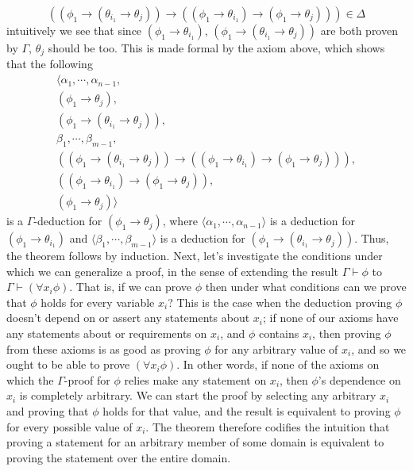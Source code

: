 \documentclass{article}
\begin{document}
{    $$ ((\phi_1 \rightarrow (\theta_{i_1} \rightarrow \theta_j)) \rightarrow ((\phi_1 \rightarrow \theta_{i_1}) \rightarrow (\phi_1 \rightarrow \theta_j))) \in \Delta $$
intuitively we see that since $ (\phi_1 \rightarrow \theta_{i_1}) $, $ (\phi_1 \rightarrow (\theta_{i_1} \rightarrow \theta_j)) $ are both proven by $ \Gamma $, $ \theta_j $ should be too. This is made formal by the axiom above, which shows that the following
$$ \begin{gathered}
    \langle \alpha_1, \cdots, \alpha_{n - 1}, \\
    (\phi_1 \rightarrow \theta_j), \\
    (\phi_1 \rightarrow (\theta_{i_1} \rightarrow \theta_j)), \\
    \beta_1, \cdots, \beta_{m - 1}, \\
    ((\phi_1 \rightarrow (\theta_{i_1} \rightarrow \theta_j)) \rightarrow ((\phi_1 \rightarrow \theta_{i_1}) \rightarrow (\phi_1 \rightarrow \theta_j))), \\
    ((\phi_1 \rightarrow \theta_{i_1}) \rightarrow (\phi_1 \rightarrow \theta_j)), \\
    (\phi_1 \rightarrow \theta_j) \rangle \nonumber
\end{gathered} $$
is a $ \Gamma $-deduction for $ (\phi_1 \rightarrow \theta_j) $, where $ \langle \alpha_1, \cdots, \alpha_{n - 1} \rangle $ is a deduction for $ (\phi_1 \rightarrow \theta_{i_1}) $ and $ \langle \beta_1, \cdots, \beta_{m - 1} \rangle $ is a deduction for $ (\phi_1 \rightarrow (\theta_{i_1} \rightarrow \theta_j)) $.
\n
Thus, the theorem follows by induction.}
Next, let's investigate the conditions under which we can generalize a proof, in the sense of extending the result $ \Gamma \vdash \phi $ to $ \Gamma \vdash (\forall x_i \phi) $. That is, if we can prove $ \phi $ then under what conditions can we prove that $ \phi $ holds for every variable $ x_i $? This is the case when the deduction proving $ \phi $ doesn't depend on or assert any statements about $ x_i $; if none of our axioms have any statements about or requirements on $ x_i $, and $ \phi $ contains $ x_i $, then proving $ \phi $ from these axioms is as good as proving $ \phi $ for any arbitrary value of $ x_i $, and so we ought to be able to prove $ (\forall x_i \phi) $. In other words, if none of the axioms on which the $ \Gamma $-proof for $ \phi $ relies make any statement on $ x_i $, then $ \phi $'s dependence on $ x_i $ is completely arbitrary. We can start the proof by selecting any arbitrary $ x_i $ and proving that $ \phi $ holds for that value, and the result is equivalent to proving $ \phi $ for every possible value of $ x_i $. The theorem therefore codifies the intuition that proving a statement for an arbitrary member of some domain is equivalent to proving the statement over the entire domain.
\end{document}
